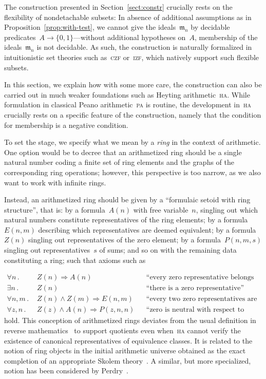\documentclass[com,11pt,crcready]{iosart2x}
\theoremstyle{definition}
\theoremstyle{plain}
\theoremstyle{remark}
\newcommand{\?}{\,{:}\,}
\newcommand{\mmm}{\mathfrak{m}}
\renewcommand{\_}{\mathpunct{.}\,}
\begin{document}
The construction presented in Section~\ref{sect:constr} crucially rests on the
flexibility of nondetachable subsets: In absence of additional
assumptions as in Proposition~\ref{prop:with-test},
we cannot give the ideals~$\mmm_n$ by decidable
predicates~$A \to \{0,1\}$---without additional hypotheses on~$A$, membership of the
ideals~$\mmm_n$ is not decidable. As such, the construction is
naturally formalized in intuitionistic set theories such as~\textsc{czf}
or~\textsc{izf}, which natively support such flexible subsets.

In this section, we explain how with some more care, the construction can also
be carried out in much weaker foundations such as Heyting
arithmetic~\textsc{ha}. While formulation in classical Peano arithmetic~\textsc{pa}
is routine, the development in~\textsc{ha} crucially rests on a specific
feature of the construction, namely that the condition for membership is a
negative condition.

To set the stage, we specify what we mean by a \emph{ring} in the context of
arithmetic. One option would be to decree that an arithmetized ring should be a single
natural number coding a finite set of ring elements and the graphs of the
corresponding ring operations; however, this perspective is too narrow, as we
also want to work with infinite rings.

Instead, an arithmetized ring should be given by a ``formulaic setoid with ring
structure'', that is: by a formula~$A(n)$ with free
variable~$n$, singling out which natural numbers constitute
representatives of the ring elements; by a formula~$E(n,m)$ describing which
representatives are deemed equivalent; by a formula~$Z(n)$ singling out
representatives of the zero element; by a formula~$P(n,m,s)$ singling out
representatives~$s$ of sums; and so on with the remaining data constituting
a ring; such that axioms such as\par
{\vspace*{-1.2em}\small\begin{align*}
  \forall n\_ & Z(n) \Rightarrow A(n) && \text{``every zero representative belongs to the ring''} \\
  \exists n\_ & Z(n) && \text{``there is a zero representative''} \\
  \forall n,m\_ & Z(n) \wedge Z(m) \Longrightarrow E(n,m) && \text{``every two zero representatives are equivalent''} \\
  \forall z,n\_ & Z(z) \wedge A(n) \Longrightarrow P(z,n,n) && \text{``zero is neutral with respect to addition''}
\end{align*}}%
hold. This conception of arithmetized rings deviates from the usual definition
in reverse mathematics~\cite[Definition~III.5.1]{simpson:subsystems} to support
quotients even when~\textsc{ha} cannot verify the existence of
canonical representatives of equivalence classes. It is related to the notion
of ring objects in the initial arithmetic universe obtained as the exact
completion of an appropriate Skolem theory~\cite{maietti:au,vickers:sketches}.
A similar, but more specialized, notion has been considered by
Perdry~\cite[Section~2]{perdry:lazy}.
\end{document}
